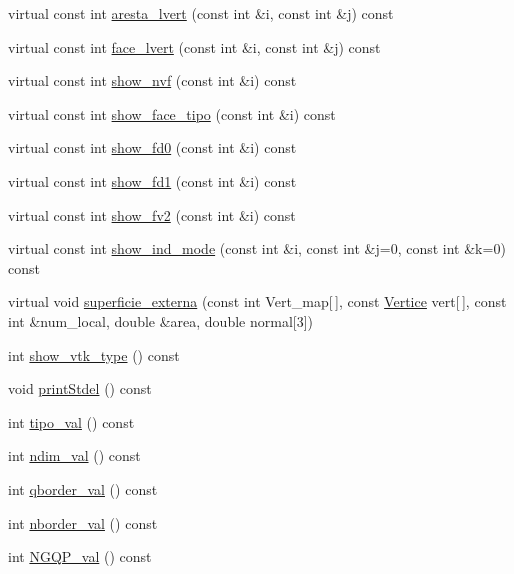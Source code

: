 \begin{DoxyCompactItemize}
\item 
virtual const int \hyperlink{classLinear_a1111d1b38590d73c38e2a09b57ed8413}{aresta\+\_\+lvert} (const int \&i, const int \&j) const
\item 
virtual const int \hyperlink{classLinear_ab27641b2d84128bc1cfaf87f40d5af45}{face\+\_\+lvert} (const int \&i, const int \&j) const
\item 
virtual const int \hyperlink{classLinear_a9f907dbeb4f31d1633f7f5819093881f}{show\+\_\+nvf} (const int \&i) const
\item 
virtual const int \hyperlink{classLinear_a696305db90ca619b2bbbb1fbbb360e8e}{show\+\_\+face\+\_\+tipo} (const int \&i) const
\item 
virtual const int \hyperlink{classLinear_a1bbad0d40ac2e1d16097e1510ce19c07}{show\+\_\+fd0} (const int \&i) const
\item 
virtual const int \hyperlink{classLinear_a8c97f726b71671ed6eac8ef83e136a04}{show\+\_\+fd1} (const int \&i) const
\item 
virtual const int \hyperlink{classLinear_aa0fe8dfc164afda4e30551322de7984e}{show\+\_\+fv2} (const int \&i) const
\item 
virtual const int \hyperlink{classLinear_a6de1b726827024c428333e79df48e866}{show\+\_\+ind\+\_\+mode} (const int \&i, const int \&j=0, const int \&k=0) const
\item 
virtual void \hyperlink{classLinear_a33a083b6398f6ee6dfa090a7b10d8de1}{superficie\+\_\+externa} (const int Vert\+\_\+map\mbox{[}$\,$\mbox{]}, const \hyperlink{structVertice}{Vertice} vert\mbox{[}$\,$\mbox{]}, const int \&num\+\_\+local, double \&area, double normal\mbox{[}3\mbox{]})
\item 
int \hyperlink{classStdel_a56288a857b95a55c8b7eb5b473e836d9}{show\+\_\+vtk\+\_\+type} () const
\item 
void \hyperlink{classStdel_a54b5768d09f500cb949e66fc234eac70}{print\+Stdel} () const
\item 
int \hyperlink{classStdel_a75023fc369db2752845a9ce278f10929}{tipo\+\_\+val} () const
\item 
int \hyperlink{classStdel_a383df930bee8dc298d7d412b3b632ebb}{ndim\+\_\+val} () const
\item 
int \hyperlink{classStdel_a457d20e34fb7a32eb1e4aca6c19f53a2}{qborder\+\_\+val} () const
\item 
int \hyperlink{classStdel_aac8e97661e46c48fafa91f13caa03a9f}{nborder\+\_\+val} () const
\item 
int \hyperlink{classStdel_a2f964819235e0a55fd60733518b592f2}{N\+G\+Q\+P\+\_\+val} () const

\end{DoxyCompactItemize}
